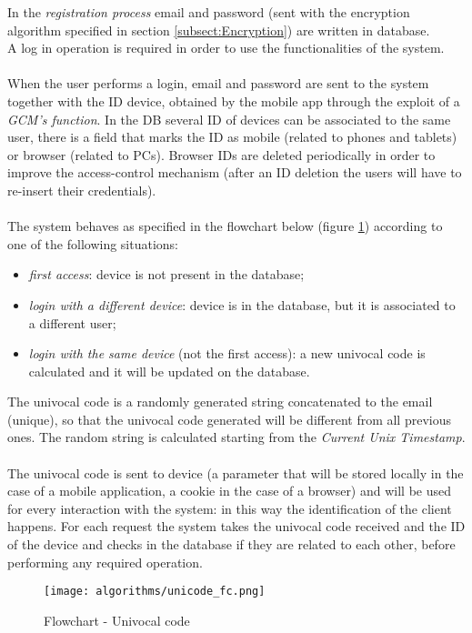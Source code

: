 In the \textit{registration process} email and password (sent with the encryption algorithm specified in section \ref{subsect:Encryption}) are written in database.\\
A log in operation is required in order to use the functionalities of the system.
\\\\
When the user performs a login, email and password are sent to the system together with the ID device, obtained by the mobile app through the exploit of a \textit{GCM's function}. In the DB several ID of devices can be associated to the same user, there is a field that marks the ID as mobile (related to phones and tablets) or browser (related to PCs). Browser IDs are deleted periodically in order to improve the access-control mechanism (after an ID deletion the users will have to re-insert their credentials).
\\\\
The system behaves as specified in the flowchart below (figure \ref{figure:Flowchart - Univocal code}) according to one of the following situations:
\begin{itemize}
\item \textit{first access}: device is not present in the database;
\item \textit{login with a different device}: device is in the database, but it is associated to a different user;
\item \textit{login with the same device} (not the first access): a new univocal code is calculated and it will be updated on the database.
\end{itemize}
The univocal code is a randomly generated string concatenated to the email (unique), so that the univocal code generated will be different from all previous ones. The random string is calculated starting from the \textit{Current Unix Timestamp}.
\\\\
The univocal code is sent to device (a parameter that will be stored locally in the case of a mobile application, a cookie in the case of a browser) and will be used for every interaction with the system: in this way the identification of the client happens. For each request the system takes the univocal code received and the ID of the device and checks in the database if they are related to each other, before performing any required operation. 
\begin{figure}[H]
	\begin{center}
		\texttt{[image: algorithms/unicode\_fc.png]}
	\caption{Flowchart - Univocal code}
	\label{figure:Flowchart - Univocal code}
	\end{center}
\end{figure}

